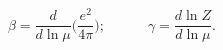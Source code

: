\begin{equation}\label{Beta_Gamma_Definition}
\beta = \frac{d}{d\ln\mu}\Bigg(\frac{e^2}{4\pi}\Bigg);
\qquad\quad
\gamma = \frac{d\ln Z}{d\ln\mu}.
\end{equation}

